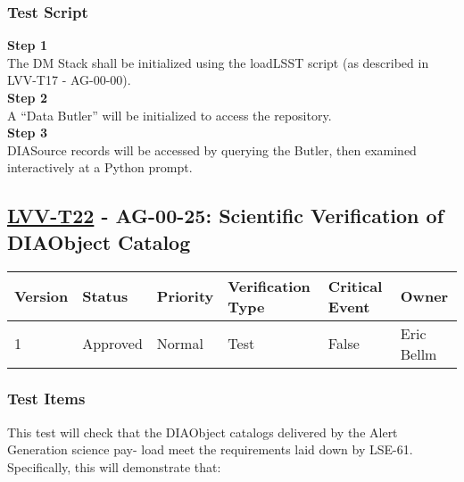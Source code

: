 \subsubsection{Test Script}\label{test-script-4}

\textbf{Step 1}\\
The DM Stack shall be initialized using the loadLSST script (as
described in LVV-T17 - AG-00-00).\\[2\baselineskip]\textbf{Step 2}\\
A ``Data Butler'' will be initialized to access the
repository.\\[2\baselineskip]\textbf{Step 3}\\
DIASource records will be accessed by querying the Butler, then examined
interactively at a Python prompt.\\[2\baselineskip]

\hypertarget{lvv-t22---ag-00-25-scientific-verification-of-diaobject-catalog}{\subsection{\texorpdfstring{\href{https://jira.lsstcorp.org/secure/Tests.jspa\#/testCase/LVV-T22}{LVV-T22}
- AG-00-25: Scientific Verification of DIAObject
Catalog}{LVV-T22 - AG-00-25: Scientific Verification of DIAObject Catalog}}\label{lvv-t22---ag-00-25-scientific-verification-of-diaobject-catalog}}

\begin{longtable}[]{@{}llllll@{}}
\toprule
Version & Status & Priority & Verification Type & Critical Event &
Owner\tabularnewline
\midrule
\endhead
1 & Approved & Normal & Test & False & Eric Bellm\tabularnewline
\bottomrule
\end{longtable}

\subsubsection{Test Items}\label{test-items-5}

This test will check that the DIAObject catalogs delivered by the Alert
Generation science pay- load meet the requirements laid down by
LSE-61.\\
Specifically, this will demonstrate that:

